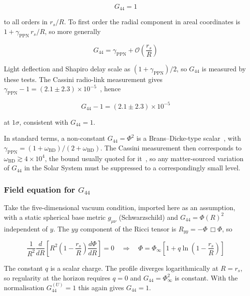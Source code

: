 \documentclass[pdflatex,sn-mathphys-num]{sn-jnl}%
\theoremstyle{thmstyleone}%
\theoremstyle{thmstyletwo}%
\theoremstyle{thmstylethree}%
\begin{document}
\begin{equation}
    \boxed{G_{44}=1}
\end{equation}
 
to all orders in $r_s/R$. To first order the radial component in areal coordinates is $1+\gamma_{\mathrm{PPN}}\,r_s/R$, so more generally
 
\begin{equation}
    G_{44}=\gamma_{\mathrm{PPN}}+\mathcal{O}\left(\frac{r_s}{R}\right)
\end{equation}
 
Light deflection and Shapiro delay scale as $(1+\gamma_{\mathrm{PPN}})/2$, so $G_{44}$ is measured by these tests. The Cassini radio-link measurement gives $\gamma_{\mathrm{PPN}}-1=(2.1\pm2.3)\times10^{-5}$~\cite{Bertotti2003}, hence
 
\begin{equation}
    G_{44}-1=(2.1\pm2.3)\times10^{-5}
\end{equation}
 
at $1\sigma$, consistent with $G_{44}=1$.

In standard terms, a non-constant $G_{44}=\Phi^2$ is a Brans--Dicke-type scalar~\cite{BransDicke1961,OverduinWesson1997}, with $\gamma_{\mathrm{PPN}}=(1+\omega_{\mathrm{BD}})/(2+\omega_{\mathrm{BD}})$. The Cassini measurement then corresponds to $\omega_{\mathrm{BD}}\gtrsim4\times10^{4}$, the bound usually quoted for it~\cite{Bertotti2003}, so any matter-sourced variation of $G_{44}$ in the Solar System must be suppressed to a correspondingly small level.

 
\subsubsection{Field equation for $G_{44}$}
 
Take the five-dimensional vacuum condition, imported here as an assumption, with a static spherical base metric $g_{\mu\nu}$ (Schwarzschild) and $G_{44}=\Phi(R)^2$ independent of $y$. The $yy$ component of the Ricci tensor is $R_{yy}=-\Phi\,\Box\Phi$, so
 
\begin{equation}
    \frac{1}{R^2}\frac{d}{dR}\left[R^2\left(1-\frac{r_s}{R}\right)\frac{d\Phi}{dR}\right]=0
    \quad\Rightarrow\quad
    \Phi=\Phi_\infty\left[1+q\ln\left(1-\frac{r_s}{R}\right)\right]
\end{equation}
 
The constant $q$ is a scalar charge. The profile diverges logarithmically at $R=r_s$, so regularity at the horizon requires $q=0$ and $G_{44}=\Phi_\infty^2$ is constant. With the normalisation $G_{44}^{(U)}=1$ this again gives $G_{44}=1$.
\end{document}
